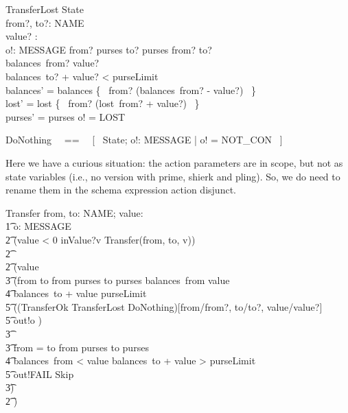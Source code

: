 \documentclass{article}
\begin{document}
\begin{schema}{TransferLost}
   \Delta State \\
   from?, to?: NAME \\
   value? : \nat \\
   o!: MESSAGE
\where
   from? \in purses \land  to? \in purses \land from? \neq to? \\
   balances~from? \geq value? \\
   balances~to? + value? < purseLimit \\
   balances' = balances \oplus \{~ from? \mapsto (balances~from? - value?) ~\} \\
   lost' = lost  \oplus \{~ from? \mapsto (lost~from? + value?) ~\} \\
   purses' = purses \land o! = LOST
\end{schema}

\begin{zed}
   DoNothing ~~==~~ [~ \Xi State; o!: MESSAGE | o! = NOT\_CON ~]
\end{zed}

Here we have a curious situation: the action parameters are in scope, but not
as state variables (i.e., no version with prime, shierk and pling). So, we do need
to rename them in the schema expression action disjunct.
%
\begin{circusaction}
    Transfer \circdef from, to: NAME; value: \nat \circspot \\
    	\t1 \circvar o: MESSAGE \circspot \\
		\t2 (\lcircguard value < 0 \rcircguard \circguard inValue?v \then Transfer(from, to, v)) \\
		\t2 \extchoice \\
		\t2 (\lcircguard value  \rcircguard \circguard \\
			\t3 (\lcircguard from \neq to \land from \in purses \land to \in purses \land balances~from \geq value \\
				\t4 \land balances~to + value \leq purseLimit \rcircguard \circguard \\
					\t5 (\lschexpract (TransferOk \lor TransferLost \lor DoNothing)[from/from?, to/to?, value/value?] \rschexpract \circseq \\
					\t5 out!o \then \Skip) \\
			\t3 \extchoice \\
			 \t3  \lcircguard from = to \lor from \notin purses \lor to \notin purses \lor \\
			 	\t4  balances~from < value \lor balances~to + value > purseLimit \rcircguard \circguard \\
					\t5 out!FAIL \then Skip \\
			 \t3) \\
	        \t2 )
\end{circusaction}
\end{document}
